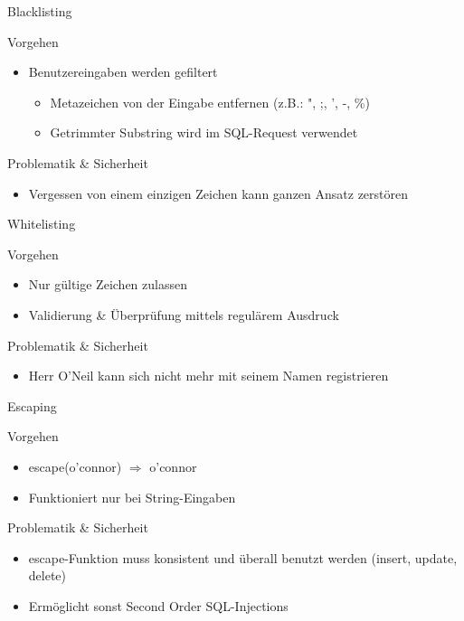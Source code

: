 \begin{frame}{Blacklisting}
\begin{block}{Vorgehen}
\begin{itemize}
\item Benutzereingaben werden gefiltert
	\begin{itemize}
	\item Metazeichen von der Eingabe entfernen (z.B.: ", ;, ', -, \%)
	\item Getrimmter Substring wird im SQL-Request verwendet
	\end{itemize}
\end{itemize}
\end{block}
\begin{block}{Problematik \& Sicherheit}	
\begin{itemize}
\item Vergessen von einem einzigen Zeichen kann ganzen Ansatz zerstören
\end{itemize}
\end{block}
\end{frame}

\begin{frame}{Whitelisting}
\begin{block}{Vorgehen}
\begin{itemize}
	\item Nur gültige Zeichen zulassen
	\item Validierung \& Überprüfung mittels regulärem Ausdruck
\end{itemize}	
\end{block}
\begin{block}{Problematik \& Sicherheit}	
\begin{itemize}
\item Herr O'Neil kann sich nicht mehr mit seinem Namen registrieren
\end{itemize}
\end{block}
\end{frame}


\begin{frame}{Escaping}
\begin{block}{Vorgehen}
\begin{itemize}
\item escape(o'connor) $\Rightarrow$ o'connor
\item Funktioniert nur bei String-Eingaben
\end{itemize}
\end{block}
\begin{block}{Problematik \& Sicherheit}
\begin{itemize}
\item escape-Funktion muss konsistent und überall benutzt werden (insert, update, delete)	
\item Ermöglicht sonst Second Order SQL-Injections
\end{itemize}
\end{block}
\end{frame}

